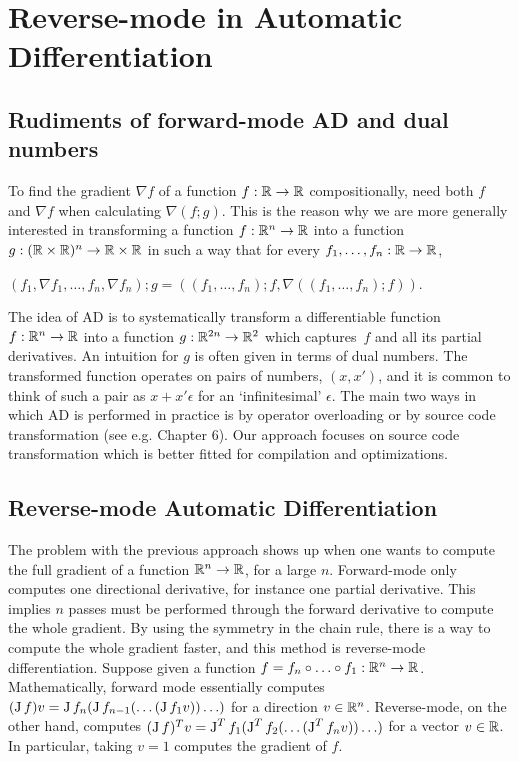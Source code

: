 \section{Reverse-mode in Automatic Differentiation}
\label{sec:background}

\subsection{Rudiments of forward-mode AD and dual numbers}

To find the gradient $\nabla f$ of a function $f:\mathbb{R}\to \mathbb{R}$ compositionally, need both $f$ and $\nabla f$ when calculating $\nabla (f;g)$.
This is the reason why we are more generally interested in transforming a function $f:\mathbb{R}^n\to \mathbb{R}$ into a function
$g:(\mathbb{R}\times \mathbb{R})^n\to \mathbb{R}\times \mathbb{R}$ in such a way that for every
$f_1, \dots, f_n:\mathbb{R}\to\mathbb{R}$, 
\begin{center}
    $(f_1,\nabla f_1,\dots, f_n,\nabla f_n);g = ((f_1,\dots, f_n);f,\nabla ((f_1, \dots, f_n);f))$.
\end{center}

The idea of AD is to systematically transform a differentiable function $f:\mathbb{R}^n\to \mathbb{R}$ into a function $g:\mathbb{R}^{2n}\to \mathbb{R}^2$ which captures~$f$ and all its partial derivatives.
An intuition for $g$ is often given in terms of dual numbers. The transformed function operates on pairs of numbers, $(x,x')$, and it is common
to think of such a pair as $x+x'\epsilon$ for an `infinitesimal' $\epsilon$. The main two ways in which AD is performed in practice is by operator overloading or by source code transformation (see e.g. \cite{griewank2008evaluating} Chapter 6). 
Our approach focuses on source code transformation which is better fitted for compilation and optimizations.

\subsection{Reverse-mode Automatic Differentiation}

The problem with the previous approach shows up when one wants to compute the full gradient of a function $\mathbb{R}^n\to\mathbb{R}$, for a large $n$. 
Forward-mode only computes one directional derivative, for instance one partial derivative. 
This implies $n$ passes must be performed through the forward derivative to compute the whole gradient.
By using the symmetry in the chain rule, there is a way to compute the whole gradient faster, and this method is reverse-mode differentiation.
Suppose given a function $f=f_n\circ\ldots\circ f_1 :\mathbb{R}^n\to\mathbb{R}$. 
Mathematically, forward mode essentially computes $(\operatorname{J} f)v=\operatorname{J} f_n(\operatorname{J} f_{n-1}(\ldots(\operatorname{J} f_1v))\ldots)$ for a direction $v\in\mathbb{R}^n$. 
Reverse-mode, on the other hand, computes $(\operatorname{J} f)^Tv = \operatorname{J}^Tf_1(\operatorname{J}^T f_{2}(\ldots(\operatorname{J}^T f_nv))\ldots)$ for a vector $v\in\mathbb{R}$.
In particular, taking $v=1$ computes the gradient of $f$.

